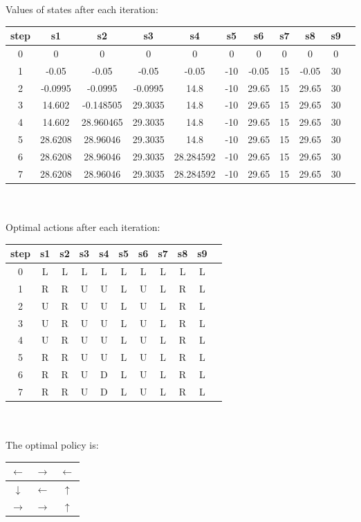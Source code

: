 \documentclass{article}
\begin{document}
Values of states after each iteration:\\
\begin{tabular}{|c|c|c|c|c|c|c|c|c|c|c|}
\hline
 step & s1 & s2 & s3 & s4 & s5 & s6 & s7 & s8 & s9 \\
\hline
    0 & 0 & 0 & 0 & 0 & 0 & 0 & 0 & 0 & 0 \\
\hline
    1 & -0.05  & -0.05  & -0.05  & -0.05  & -10  & -0.05  & 15  & -0.05  & 30  \\
\hline
    2 & -0.0995  &  -0.0995 & -0.0995  & 14.8  &  -10 &  29.65  & 15  &  29.65 & 30  \\
\hline
    3 & 14.602  & -0.148505  & 29.3035  &  14.8 &  -10 &  29.65 & 15  &  29.65 & 30 \\
\hline
    4 & 14.602   &  28.960465 & 29.3035  & 14.8  & -10  & 29.65  &  15 &  29.65 &  30 \\
\hline
    5 & 28.6208  &  28.96046 &  29.3035 &  14.8 & -10  & 29.65  &  15 &  29.65 &  30\\
\hline
    6 & 28.6208  &  28.96046 &  29.3035 & 28.284592  & -10  & 29.65  &  15 &  29.65 &  30\\
\hline
    7 & 28.6208  &  28.96046 &  29.3035 & 28.284592  & -10  & 29.65  &  15 &  29.65 &  30\\
\hline
\end{tabular} \\ \\
Optimal actions after each iteration:\\
\begin{tabular}{|c|c|c|c|c|c|c|c|c|c|c|}
    \hline
     step & s1 & s2 & s3 & s4 & s5 & s6 & s7 & s8 & s9 \\
    \hline
        0 & L & L & L & L & L & L & L & L & L \\
    \hline
        1 & R & R & U & U & L & U & L & R & L \\
    \hline
        2 & U  &  R & U  & U &  L &  U & L  &  R &  L \\
    \hline
        3 & U  &  R & U  & U  & L  &  U & L  & R & L  \\
    \hline
        4 & U & R  & U  &  U & L  &  U &  L & R  & L  \\
    \hline
        5 & R & R  & U  &  U & L  &  U &  L & R  & L    \\
    \hline
        6 & R & R  & U  &  D & L  &  U &  L & R  & L    \\
    \hline
        7 & R & R  & U  &  D & L  &  U &  L & R  & L    \\
    \hline
    \end{tabular}\\ \\
    The optimal policy is: \\
    \begin{tabular}{|c|c|c|}
        \hline
            $\leftarrow $ & $\rightarrow $ & $\leftarrow $ \\
        \hline
            $\downarrow $ & $\leftarrow $ & $\uparrow $ \\
        \hline
            $\rightarrow $ & $\rightarrow $ & $\uparrow $ \\
        \hline
    \end{tabular}
\end{document}
